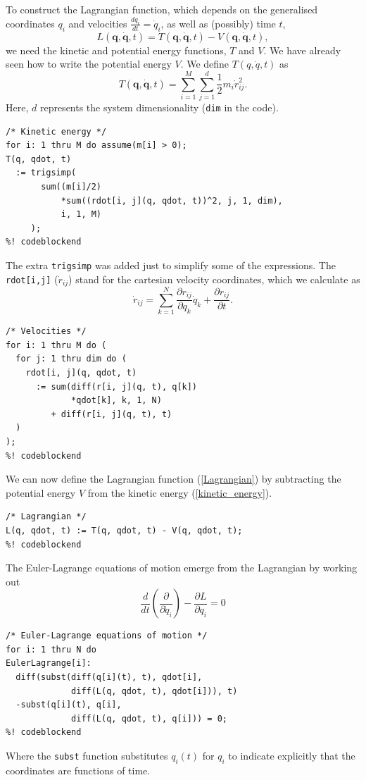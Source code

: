 \documentclass{article}
\begin{document}
To construct the Lagrangian function, which depends on the generalised
coordinates $q_i$ and velocities $\frac{dq_i}{dt} = \dot{q}_i$, as well as
(possibly) time $t$,
\begin{equation}
\label{Lagrangian}
  L(\mathbf{q}, \dot{\mathbf{q}}, t)
   = T(\mathbf{q}, \dot{\mathbf{q}}, t) - V(\mathbf{q}, \dot{\mathbf{q}}, t),
\end{equation}
we need the kinetic and potential energy functions, $T$ and $V$. We have already
seen how to write the potential energy $V$. We define $T(q, \dot{q}, t)$ as
\begin{equation}
\label{kinetic_energy}
  T(\mathbf{q}, \dot{\mathbf{q}}, t)
    = \sum_{i = 1}^M\sum_{j = 1}^{d} \frac{1}{2} m_i \dot{r}_{ij}^2.
\end{equation}
Here, $d$ represents the system dimensionality (\texttt{dim} in the code).
\begin{lstlisting}[frame=single]
%! codeblock: kinetic_energy
/* Kinetic energy */
for i: 1 thru M do assume(m[i] > 0);
T(q, qdot, t)
  := trigsimp(
       sum((m[i]/2)
           *sum((rdot[i, j](q, qdot, t))^2, j, 1, dim),
           i, 1, M)
     );
%! codeblockend
\end{lstlisting}
The extra \texttt{trigsimp} was added just to simplify some of the expressions.
The \texttt{rdot[i,j]} ($\dot{r}_{ij}$) stand for the cartesian
velocity coordinates, which we calculate as
\begin{equation}
  \dot{r}_{ij}
    = \sum_{k = 1}^N \frac{\partial r_{ij}}{\partial q_k}\dot{q}_k
      + \frac{\partial r_{ij}}{\partial t}.
\end{equation}
\begin{lstlisting}[frame=single]
%! codeblock: velocities
/* Velocities */
for i: 1 thru M do (
  for j: 1 thru dim do (
    rdot[i, j](q, qdot, t)
      := sum(diff(r[i, j](q, t), q[k])
             *qdot[k], k, 1, N)
         + diff(r[i, j](q, t), t)
  )
);
%! codeblockend
\end{lstlisting}

We can now define the Lagrangian function (\ref{Lagrangian}) by subtracting the
potential energy $V$ from the kinetic energy (\ref{kinetic_energy}).
\begin{lstlisting}[frame=single]
%! codeblock: Lagrangian
/* Lagrangian */
L(q, qdot, t) := T(q, qdot, t) - V(q, qdot, t);
%! codeblockend
\end{lstlisting}
The Euler-Lagrange equations of motion emerge from the Lagrangian by working out
\begin{equation}
  \frac{d}{dt}\left(\frac{\partial}{\partial \dot{q}_i}\right)
  - \frac{\partial L}{\partial q_i} = 0
\end{equation}
\begin{lstlisting}[frame=single]
%! codeblock: EulerLagrange
/* Euler-Lagrange equations of motion */
for i: 1 thru N do
EulerLagrange[i]:
  diff(subst(diff(q[i](t), t), qdot[i],
             diff(L(q, qdot, t), qdot[i])), t)
  -subst(q[i](t), q[i],
             diff(L(q, qdot, t), q[i])) = 0;
%! codeblockend
\end{lstlisting}
Where the \texttt{subst} function substitutes $q_i(t)$ for $q_i$ to indicate
explicitly that the coordinates are functions of time.
\end{document}
